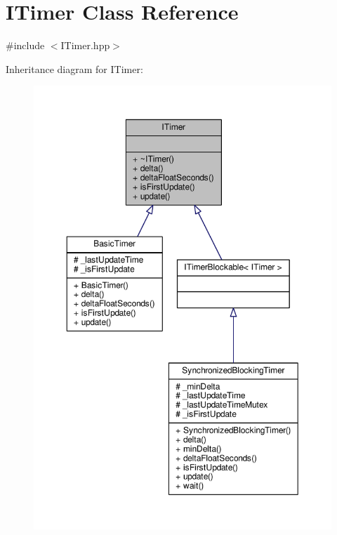 \hypertarget{class_i_timer}{\section{I\-Timer Class Reference}
\label{class_i_timer}
}


{\ttfamily \#include $<$I\-Timer.\-hpp$>$}



Inheritance diagram for I\-Timer\-:
\nopagebreak
\begin{figure}[H]
\begin{center}
\leavevmode
\includegraphics[width=350pt]{class_i_timer__inherit__graph}
\end{center}
\end{figure}


